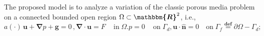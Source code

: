 \documentclass[3p]{elsarticle}
\def\g{\mathbf g}
\def\n{\bm{\widehat{ n} } }
\def\u{\mathbf u}
\def\div{\bm{\nabla} \cdot}
\def\grad{\bm{\nabla}}
\def\R{\bm{\mathbbm{R} } }
\def\defining{\overset{\mathbf{def}} =}
\begin{document}
The proposed model is to analyze a variation of the classic porous media problem on a connected bounded open region $\Omega\subset \R^{2}$, i.e., 
%
%
\begin{subequations}\label{Eq porous media strong}
%
\begin{equation}\label{Eq Darcy Strong}
a(\cdot)\, \u + \grad p  + \g = 0\,,
\end{equation}
%
\begin{equation}\label{Eq conservative strong}
\div \u = F\,\quad \mathrm{in}\; \Omega .
\end{equation}
%
\begin{equation}\label{Eq Drained Condition}
p = 0 \,\quad \mathrm{on}\; \Gamma_{d} ,
\end{equation}
%
\begin{equation}\label{Eq Non-Flux Condition}
\u\cdot\n = 0 \quad \mathrm{on}\; \Gamma_{f}\defining\partial \Omega - \Gamma_{d} ;
\end{equation}
%
\end{subequations}
%
%
\end{document}
